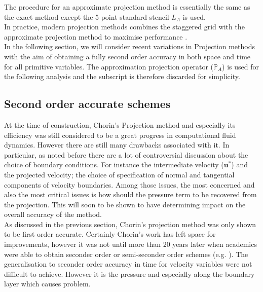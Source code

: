 The procedure for an approximate projection method is essentially the same as the exact method except the 5 point standard stencil $\textit{L}_A$ is used.\\

In practice, modern projection methods combines the staggered grid with the approximate projection method to maximise performance \cite{brown2001accurate}.\\

In the following section, we will consider recent variations in Projection methods with the aim of obtaining a fully second order accuracy in both space and time for all primitive variables. The approximation projection operator ($\mathbb{P}_A$) is used for the following analysis and the subscript is therefore discarded for simplicity.\\

\subsection{Second order accurate schemes}

At the time of construction, Chorin's Projection method and especially its efficiency was still considered to be a great progress in computational fluid dynamics. However there are still many drawbacks associated with it. In particular, as noted before there are a lot of controversial discussion about the choice of boundary conditions. For instance the intermediate velocity ($\textbf{u}^*$) and the projected velocity; the choice of specification of normal and tangential components of velocity boundaries. Among those issues, the most concerned and also the most critical issues is how should the pressure term to be recovered from the projection. This will soon to be shown to have determining impact on the overall accuracy of the method.\\

As discussed in the previous section, Chorin's projection method was only shown to be first order accurate. Certainly Chorin's work has left space for improvements, however it was not until more than 20 years later when academics were able to obtain seconder order or semi-seconder order schemes (e.g. \cite{kim1985application,bell1989second}). The generalisation to seconder order accuracy in time for velocity variables were not difficult to achieve. However it is the pressure and especially along the boundary layer which causes problem. 

